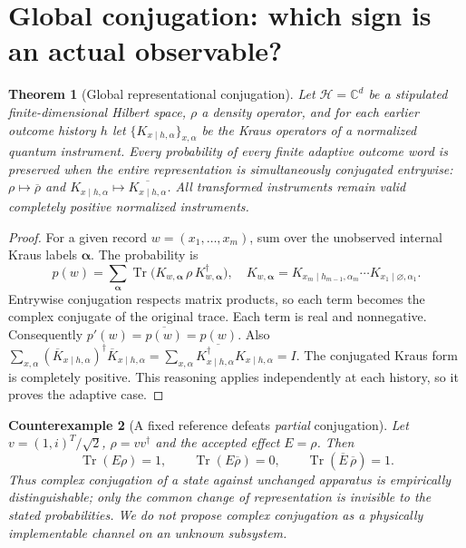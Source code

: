 \documentclass[11pt,a4paper]{article}
\newtheorem{theorem}{Theorem}
\newtheorem{example}[theorem]{Counterexample}
\newcommand{\Tr}{\operatorname{Tr}}
\begin{document}
\section{Global conjugation: which sign is an actual observable?}
\begin{theorem}[Global representational conjugation]\label{thm:gauge}
Let $\mathcal H=\mathbb C^d$ be a \emph{stipulated} finite-dimensional Hilbert space, $\rho$ a density operator, and for each earlier outcome history $h$ let $\{K_{x\mid h,\alpha}\}_{x,\alpha}$ be the Kraus operators of a normalized quantum instrument. Every probability of every finite adaptive outcome word is preserved when the \emph{entire} representation is simultaneously conjugated entrywise: $\rho\mapsto\overline\rho$ and $K_{x\mid h,\alpha}\mapsto\overline{K_{x\mid h,\alpha}}$. All transformed instruments remain valid completely positive normalized instruments.
\end{theorem}
\begin{proof}
For a given record $w=(x_1,\ldots,x_m)$, sum over the unobserved internal Kraus labels $\boldsymbol\alpha$. The probability is
\begin{equation}\label{eq:prob}
p(w)=\sum_{\boldsymbol\alpha}\Tr\bigl(K_{w,\boldsymbol\alpha}\,\rho\,K_{w,\boldsymbol\alpha}^\dagger\bigr),\quad
K_{w,\boldsymbol\alpha}=K_{x_m\mid h_{m-1},\alpha_m}\cdots K_{x_1\mid\varnothing,\alpha_1}.
\end{equation}
Entrywise conjugation respects matrix products, so each term becomes the complex conjugate of the original trace. Each term is real and nonnegative. Consequently $p'(w)=\overline{p(w)}=p(w)$. Also
$\sum_{x,\alpha}(\overline K_{x\mid h,\alpha})^\dagger\overline K_{x\mid h,\alpha}
=\overline{\sum_{x,\alpha}K_{x\mid h,\alpha}^\dagger K_{x\mid h,\alpha}}=I$.
The conjugated Kraus form is completely positive. This reasoning applies independently at each history, so it proves the adaptive case.
\end{proof}

\begin{example}[A fixed reference defeats \emph{partial} conjugation]
Let $v=(1,i)^T/\sqrt2$, $\rho=vv^\dagger$ and the accepted effect $E=\rho$. Then
\begin{equation}\label{eq:ref}
\Tr(E\rho)=1,\qquad \Tr(E\overline\rho)=0,\qquad
\Tr(\overline E\,\overline\rho)=1.
\end{equation}
Thus complex conjugation of a state against \emph{unchanged} apparatus is empirically distinguishable; only the \emph{common change of representation} is invisible to the stated probabilities. We do not propose complex conjugation as a physically implementable channel on an unknown subsystem.
\end{example}
\end{document}
